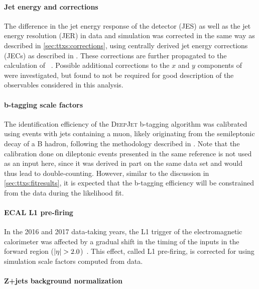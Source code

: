 \paragraph{Jet energy and \ptmiss corrections}

The difference in the jet energy response of the detector (JES) as well as the jet energy resolution (JER) in data and simulation was corrected in the same way as described in \cref{sec:ttxs:corrections}, using centrally derived jet energy corrections (JECs) as described in . These corrections are further propagated to the calculation of \ptmissvec~\cite{CMS:JME-17-001}. Possible additional corrections to the $x$ and $y$ components of \ptmissvec were investigated, but found to not be required for good description of the observables considered in this analysis. 

\paragraph{b-tagging scale factors}

The identification efficiency of the \textsc{DeepJet} b-tagging algorithm was calibrated using events with jets containing a muon, likely originating from the semileptonic decay of a B hadron, following the methodology described in . Note that the calibration done on dileptonic \ttbar events presented in the same reference is not used as an input here, since it was derived in part on the same data set and would thus lead to double-counting. However, similar to the discussion in \cref{sec:ttxs:fitresults}, it is expected that the b-tagging efficiency will be constrained from the data during the likelihood fit.

\paragraph{ECAL L1 pre-firing}

In the 2016 and 2017 data-taking years, the L1 trigger of the electromagnetic calorimeter was affected by a gradual shift in the timing of the inputs in the forward region ($|\eta| > 2.0$)~\cite{CMS:TRG-17-001}. This effect, called L1 pre-firing, is corrected for using simulation scale factors computed from data.

\paragraph{Z+jets background normalization}

